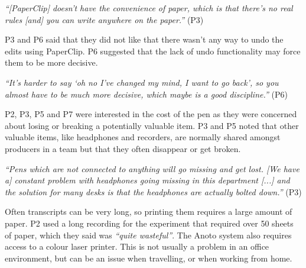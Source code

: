 \textit{``[PaperClip] doesn't have the convenience of paper, which is that there's no real rules [and] you can
write anywhere on the paper.''} (P3)




P3 and P6 said that they did not like that there wasn't any way to undo the edits using PaperClip. P6 suggested
that the lack of undo functionality may force them to be more decisive.

\textit{``It's harder to say `oh no I've changed my mind, I want to go back', so you almost have to be much more
decisive, which maybe is a good discipline.''} (P6)


P2, P3, P5 and P7 were interested in the cost of the pen as they were concerned about losing or breaking a potentially
valuable item.  P3 and P5 noted that other valuable items, like headphones and recorders, are normally shared amongst
producers in a team but that they often disappear or get broken.


\textit{``Pens which are not connected to anything will go missing and get lost.
  [We have a] constant problem with headphones going missing in this department [...]
and the solution for many desks is that the headphones are actually bolted down.''} (P3)

Often transcripts can be very long, so printing them requires a large amount of paper. P2 used a long recording
for the experiment that required over 50 sheets of paper, which they said was \textit{``quite wasteful''}.
The Anoto system also requires access to a colour laser printer.
This is not usually a problem in an office environment, but can be an issue when travelling, or when
working from home.



